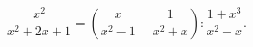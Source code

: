 \begin{ex}[type=equation]
	\begin{condition}
		$\dfrac{x^2}{x^2 + 2x  + 1} = \left(\dfrac{x}{x^2  - 1} - \dfrac{1}{x^2 + x}\right) : \dfrac{1 + x^3}{x^2 - x}.$
	\end{condition}
\end{ex}